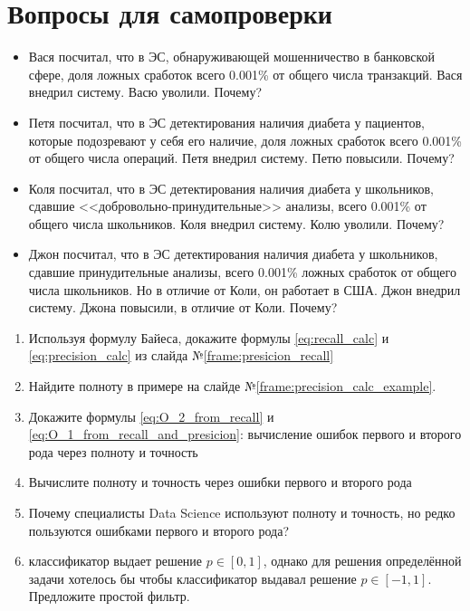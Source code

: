 \documentclass{beamer}
\begin{document}
 \section{Вопросы для самопроверки}
  
  \begin{frame}
  \small
  \begin{itemize}
  	\item Вася посчитал, что в ЭС, обнаруживающей мошенничество в банковской сфере,
  	доля ложных сработок всего 0.001\% от общего числа транзакций. 
  	Вася внедрил систему. Васю уволили. Почему?
  	\item Петя посчитал, что в ЭС детектирования наличия диабета у пациентов,
  	которые подозревают у себя его наличие, 
  	доля ложных сработок всего 0.001\% от общего числа операций.
  	Петя внедрил систему. Петю повысили. Почему?
  	\item Коля посчитал, что в ЭС детектирования наличия диабета у 
  	школьников, сдавшие <<добровольно-принудительные>> анализы, 
  	всего 0.001\% от общего числа школьников. Коля внедрил систему. Колю уволили. Почему?
  	\item Джон посчитал, что в ЭС детектирования наличия диабета у 
  	школьников, сдавшие принудительные анализы, 
  	всего 0.001\% ложных сработок от общего числа школьников. 
  	Но в отличие от Коли, он работает в США. 
  	Джон внедрил систему. Джона повысили, в отличие от Коли. Почему?
  \end{itemize}

  \end{frame}
  
  \begin{frame}
  \begin{enumerate}
    \item Используя формулу Байеса, докажите формулы \eqref{eq:recall_calc} и \eqref{eq:precision_calc} из слайда №\ref{frame:presicion_recall}
    \item Найдите полноту в примере на слайде №\ref{frame:precision_calc_example}.
    
   
   \item Докажите формулы \eqref{eq:O_2_from_recall}
     и
     \eqref{eq:O_1_from_recall_and_presicion}:
     вычисление ошибок первого и второго рода 
     через полноту и точность
  
   \item Вычислите полноту и точность через ошибки первого и второго рода
  
   \item Почему специалисты Data Science используют полноту и точность, 
  но редко пользуются ошибками первого и второго рода?
  
      \item классификатор выдает решение $p \in [0, 1]$, однако для решения
      определённой задачи хотелось бы чтобы классификатор выдавал решение $p \in [-1, 1]$.
      Предложите простой фильтр.
  \end{enumerate}
  
  
\end{frame}

  
\end{document}

